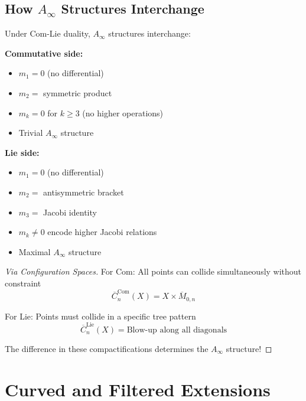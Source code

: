 \subsection{How $A_\infty$ Structures Interchange}

\begin{theorem}
Under Com-Lie duality, $A_\infty$ structures interchange:

\textbf{Commutative side:}
\begin{itemize}
\item $m_1 = 0$ (no differential)
\item $m_2 = $ symmetric product
\item $m_k = 0$ for $k \geq 3$ (no higher operations)
\item Trivial $A_\infty$ structure
\end{itemize}

\textbf{Lie side:}
\begin{itemize}
\item $m_1 = 0$ (no differential)
\item $m_2 = $ antisymmetric bracket
\item $m_3 = $ Jacobi identity
\item $m_k \neq 0$ encode higher Jacobi relations
\item Maximal $A_\infty$ structure
\end{itemize}
\end{theorem}

\begin{proof}[Via Configuration Spaces]
For Com: All points can collide simultaneously without constraint
$$\overline{C}_n^{\text{Com}}(X) = X \times \overline{M}_{0,n}$$

For Lie: Points must collide in a specific tree pattern
$$\overline{C}_n^{\text{Lie}}(X) = \text{Blow-up along all diagonals}$$

The difference in these compactifications determines the $A_\infty$ structure!
\end{proof}


\section{Curved and Filtered Extensions}

